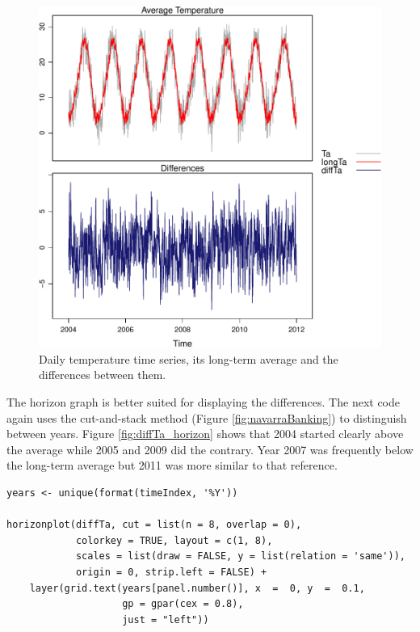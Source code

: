 \documentclass[smallroyalvopaper]{memoir}
\begin{document}
\begin{figure}[htbp]
\centering
\includegraphics[width=.9\linewidth]{figs/diffTa_xyplot.pdf}
\caption{Daily temperature time series, its long-term average and the differences between them. \label{fig:diffTa_xyplot}}
\end{figure}

The horizon graph is better suited for displaying the differences. The
next code again uses the cut-and-stack method (Figure
\ref{fig:navarraBanking}) to distinguish between years. Figure
\ref{fig:diffTa_horizon} shows that 2004 started clearly above the
average while 2005 and 2009 did the contrary. Year 2007 was frequently
below the long-term average but 2011 was more similar to that
reference.
\lstset{language=r,label= ,caption= ,captionpos=b,numbers=none}
\begin{lstlisting}
years <- unique(format(timeIndex, '%Y'))
  
horizonplot(diffTa, cut = list(n = 8, overlap = 0),
            colorkey = TRUE, layout = c(1, 8),
            scales = list(draw = FALSE, y = list(relation = 'same')),
            origin = 0, strip.left = FALSE) +
    layer(grid.text(years[panel.number()], x  =  0, y  =  0.1, 
                    gp = gpar(cex = 0.8),
                    just = "left"))
\end{lstlisting}
\end{document}
